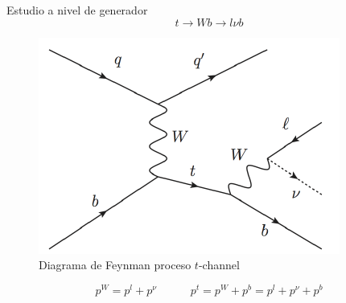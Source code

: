 \documentclass[10pt]{beamer}
\begin{document}
\begin{frame}{Estudio a nivel de generador}
 $$t\longrightarrow Wb\longrightarrow l\nu b$$
	\begin{figure}
	\centering
	\includegraphics[scale=0.345]{tchannel.png}
	\caption{Diagrama de Feynman proceso $t$-channel}
\end{figure}

$$p^W = p^l + p^\nu\quad\qquad p^t = p^W+p^b = p^l + p^\nu +p^b$$

\end{frame}
\end{document}
